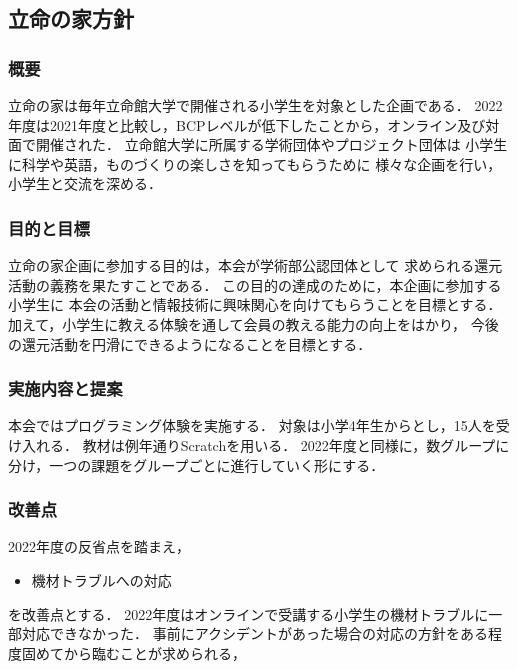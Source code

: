 \subsection*{立命の家方針}



\subsubsection*{概要}
立命の家は毎年立命館大学で開催される小学生を対象とした企画である．
2022年度は2021年度と比較し，BCPレベルが低下したことから，オンライン及び対面で開催された．
立命館大学に所属する学術団体やプロジェクト団体は
小学生に科学や英語，ものづくりの楽しさを知ってもらうために
様々な企画を行い，小学生と交流を深める．

\subsubsection*{目的と目標}
立命の家企画に参加する目的は，本会が学術部公認団体として
求められる還元活動の義務を果たすことである．
この目的の達成のために，本企画に参加する小学生に
本会の活動と情報技術に興味関心を向けてもらうことを目標とする．
加えて，小学生に教える体験を通して会員の教える能力の向上をはかり，
今後の還元活動を円滑にできるようになることを目標とする．

\subsubsection*{実施内容と提案}
本会ではプログラミング体験を実施する．
対象は小学4年生からとし，15人を受け入れる．
教材は例年通りScratchを用いる．
2022年度と同様に，数グループに分け，一つの課題をグループごとに進行していく形にする．

\subsubsection*{改善点}
2022年度の反省点を踏まえ，
\begin{itemize}
  \item 機材トラブルへの対応
\end{itemize}
を改善点とする．
2022年度はオンラインで受講する小学生の機材トラブルに一部対応できなかった．
事前にアクシデントがあった場合の対応の方針をある程度固めてから臨むことが求められる，

